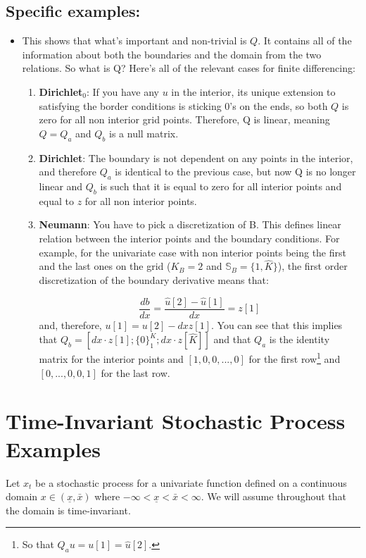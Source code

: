 \documentclass[11pt]{article}
\begin{document}
	\subsection{Specific examples:}
	\begin{itemize}
		\item This shows that what's important and non-trivial is $Q$. It contains all of the information about both the boundaries and the domain from the two relations. So what is Q? Here's all of the relevant cases for finite differencing:
		\begin{enumerate}
			\item \textbf{Dirichlet$_0$}: If you have any $u$ in the interior, its unique extension to satisfying the border conditions is sticking $0$'s on the ends, so both $Q$ is zero for all non interior grid points. Therefore, Q is linear, meaning $Q = Q_a$ and $Q_b$ is a null matrix.
			
			\item \textbf{Dirichlet}: The boundary is not dependent on any points in the interior, and therefore $Q_a$ is identical to the previous case, but now Q is no longer linear and
	 		$Q_b$ is such that it is equal to zero for all interior points and equal to $z$ for all non interior points.
			
			\item \textbf{Neumann}: You have to pick a discretization of B. This defines linear relation between the interior points and the boundary conditions. For example, for the univariate case with non interior points being the first and the last ones on the grid ($K_B = 2$ and $\mathbb{S}_B = \{1,\hat{K}\}$), the first order discretization of the boundary derivative means that: 
			
			\begin{equation}
				\frac{db}{dx} = \frac{\hat{u}[2] - \hat{u}[1]}{dx} = z[1]
			\end{equation}
			and, therefore, $u[1] = u[2] - dx z[1]$. You can see that this implies that $Q_b = [dx\cdot z[1];\{0\}_1^K;dx\cdot z[\hat{K}]]$ and that $Q_a$ is the identity matrix for the interior points and $[1,0, 0,...,0]$ for the first row\footnote{So that $Q_a u = u[1] = \hat{u}[2]$.} and $[0,...,0,0,1]$ for the last row.%
			
		\end{enumerate}
	\end{itemize}

\section{Time-Invariant Stochastic Process Examples}
Let $x_t$ be a stochastic process for a univariate function defined on a continuous domain $x \in (\underline{x}, \bar{x})$ where $-\infty < \underline{x} < \bar{x} < \infty$.  We will assume throughout that the domain is time-invariant.
\end{document}
